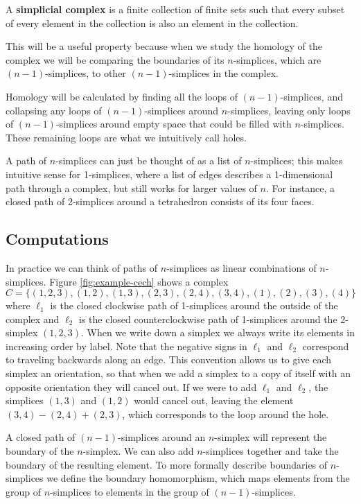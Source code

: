 \begin{definition}\label{def:simplicial-complex}
    A \textbf{simplicial complex} is a finite collection of finite sets such that every subset of every element in the collection is also an element in the collection. \cite{wagner}
\end{definition}

This will be a useful property because when we study the homology of the complex we will be comparing the boundaries of its \(n\)-simplices, which are \((n-1)\)-simplices, to other \((n-1)\)-simplices in the complex.

Homology will be calculated by finding all the loops of \((n-1)\)-simplices, and collapsing any loops of \((n-1)\)-simplices around \(n\)-simplices, leaving only loops of \((n-1)\)-simplices around empty space that could be filled with \(n\)-simplices.
These remaining loops are what we intuitively call holes.

A path of \(n\)-simplices can just be thought of as a list of \(n\)-simplices; this makes intuitive sense for 1-simplices, where a list of edges describes a 1-dimensional path through a complex, but still works for larger values of \(n\).
For instance, a closed path of 2-simplices around a tetrahedron consists of its four faces.

\subsection{Computations}

In practice we can think of paths of \(n\)-simplices as linear combinations of \(n\)-simplices.
Figure \ref{fig:example-cech} shows a complex \(C = \{ (1,2,3), (1,2), (1,3), (2,3), (2,4), (3,4), (1), (2), (3), (4) \}\) where \(\ell_1\) is the closed clockwise path of 1-simplices around the outside of the complex and \(\ell_2\) is the closed counterclockwise path of 1-simplices around the 2-simplex \((1,2,3)\).
When we write down a simplex we always write its elements in increasing order by label.
Note that the negative signs in \(\ell_1\) and \(\ell_2\) correspond to traveling backwards along an edge.
This convention allows us to give each simplex an orientation, so that when we add a simplex to a copy of itself with an opposite orientation they will cancel out.
If we were to add \(\ell_1\) and \(\ell_2\), the simplices \((1, 3)\) and \((1, 2)\) would cancel out, leaving the element \((3, 4) - (2, 4) + (2, 3)\), which corresponds to the loop around the hole.

A closed path of \((n-1)\)-simplices around an \(n\)-simplex will represent the boundary of the \(n\)-simplex.
We can also add \(n\)-simplices together and take the boundary of the resulting element.
To more formally describe boundaries of \(n\)-simplices we define the boundary homomorphism, which maps elements from the group of \(n\)-simplices to elements in the group of \((n-1)\)-simplices.

